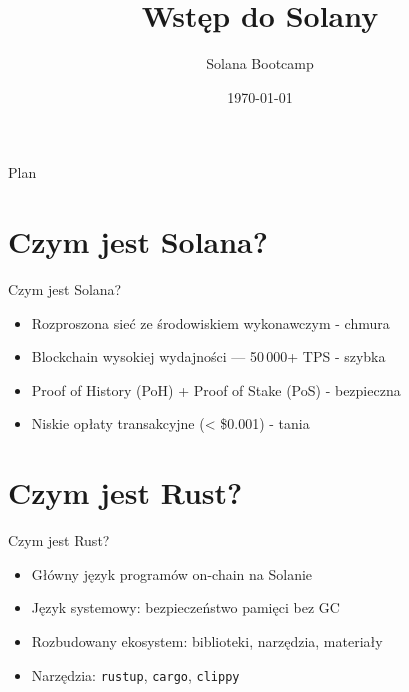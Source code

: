 

\usepackage[utf8]{inputenc}
\usepackage[T1]{fontenc}

\title{Wstęp do Solany}
\subtitle{Solana Bootcamp}
\author{}
\date{\today}



\begin{frame}
  \titlepage
\end{frame}

\begin{frame}{Plan}
  \tableofcontents
\end{frame}

\section{Czym jest Solana?}

\begin{frame}{Czym jest Solana?}
  \begin{itemize}
    \item Rozproszona sieć ze środowiskiem wykonawczym - chmura
    \item Blockchain wysokiej wydajności --- 50\,000+ TPS - szybka
    \item Proof of History (PoH) + Proof of Stake (PoS) - bezpieczna
    \item Niskie opłaty transakcyjne (\textless{} \$0.001) - tania
  \end{itemize}
\end{frame}

\section{Czym jest Rust?}

\begin{frame}{Czym jest Rust?}
  \begin{itemize}
    \item Główny język programów on-chain na Solanie
    \item Język systemowy: bezpieczeństwo pamięci bez GC
    \item Rozbudowany ekosystem: biblioteki, narzędzia, materiały
    \item Narzędzia: \texttt{rustup}, \texttt{cargo}, \texttt{clippy}
  \end{itemize}
\end{frame}

